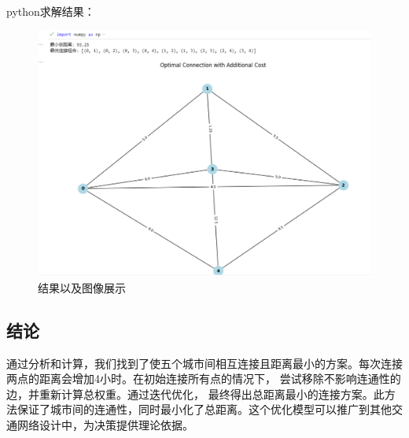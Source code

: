 \documentclass[12pt, a4paper, oneside]{ctexart}
\begin{document}
python求解结果：
\begin{figure}[htbp]
    \centering
    \includegraphics[scale=0.45]{image.png}
    \caption{结果以及图像展示}
\end{figure} 

\subsection{结论}
通过分析和计算，我们找到了使五个城市间相互连接且距离最小的方案。每次连接两点的距离会增加4小时。在初始连接所有点的情况下，
尝试移除不影响连通性的边，并重新计算总权重。通过迭代优化，
最终得出总距离最小的连接方案。此方法保证了城市间的连通性，同时最小化了总距离。这个优化模型可以推广到其他交通网络设计中，为决策提供理论依据。
\end{document}
